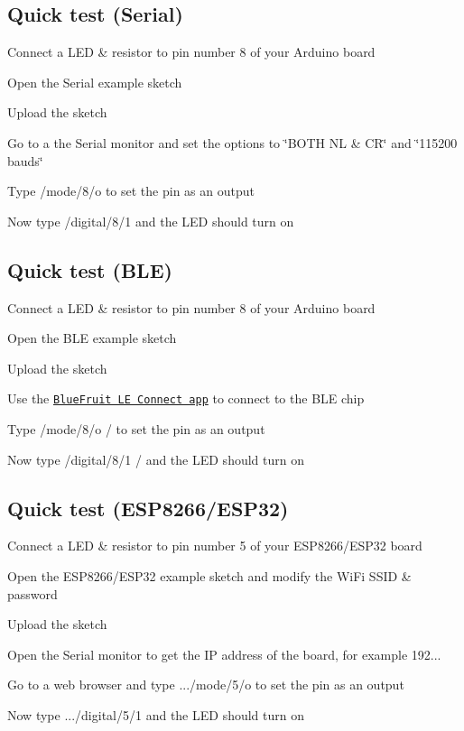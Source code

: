 \subsection*{Quick test (Serial)}


\begin{DoxyEnumerate}
\item Connect a L\+ED \& resistor to pin number 8 of your Arduino board
\item Open the Serial example sketch
\item Upload the sketch
\item Go to a the Serial monitor and set the options to \char`\"{}\+B\+O\+T\+H N\+L \& C\+R\char`\"{} and \char`\"{}115200 bauds\char`\"{}
\item Type {\ttfamily /mode/8/o} to set the pin as an output
\item Now type {\ttfamily /digital/8/1} and the L\+ED should turn on
\end{DoxyEnumerate}

\subsection*{Quick test (B\+LE)}


\begin{DoxyEnumerate}
\item Connect a L\+ED \& resistor to pin number 8 of your Arduino board
\item Open the B\+LE example sketch
\item Upload the sketch
\item Use the \href{https://itunes.apple.com/fr/app/adafruit-bluefruit-le-connect/id830125974?mt=8}{\tt Blue\+Fruit LE Connect app} to connect to the B\+LE chip
\item Type {\ttfamily /mode/8/o /} to set the pin as an output
\item Now type {\ttfamily /digital/8/1 /} and the L\+ED should turn on
\end{DoxyEnumerate}

\subsection*{Quick test (E\+S\+P8266/\+E\+S\+P32)}


\begin{DoxyEnumerate}
\item Connect a L\+ED \& resistor to pin number 5 of your E\+S\+P8266/\+E\+S\+P32 board
\item Open the E\+S\+P8266/\+E\+S\+P32 example sketch and modify the Wi\+Fi S\+S\+ID \& password
\item Upload the sketch
\item Open the Serial monitor to get the IP address of the board, for example 192...
\item Go to a web browser and type {.../mode/5/o} to set the pin as an output
\item Now type {.../digital/5/1} and the L\+ED should turn on
\end{DoxyEnumerate}

